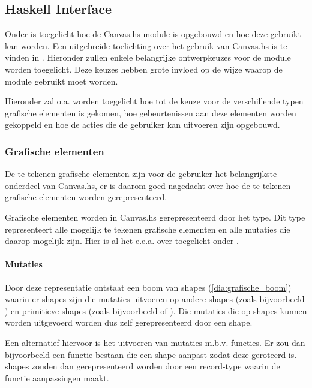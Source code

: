 \subsection{Haskell Interface} \label{subsec:grafische_bibliotheek} 

Onder  is toegelicht hoe de Canvas.hs-module is opgebouwd en hoe deze gebruikt kan worden. Een uitgebreide toelichting over het gebruik van Canvas.hs is te vinden in . Hieronder zullen enkele belangrijke ontwerpkeuzes voor de module worden toegelicht. Deze keuzes hebben grote invloed op de wijze waarop de module gebruikt moet worden. 

Hieronder zal o.a. worden toegelicht hoe tot de keuze voor de verschillende typen grafische elementen is gekomen, hoe gebeurtenissen aan deze elementen worden gekoppeld en hoe de acties die de gebruiker kan uitvoeren zijn opgebouwd.

\subsubsection{Grafische elementen}
De te tekenen grafische elementen zijn voor de gebruiker het belangrijkste onderdeel van Canvas.hs, er is daarom goed nagedacht over hoe de te tekenen grafische elementen worden gerepresenteerd. 

Grafische elementen worden in Canvas.hs gerepresenteerd door het type. Dit type representeert alle mogelijk te tekenen grafische elementen en alle mutaties die daarop mogelijk zijn. Hier is al het e.e.a. over toegelicht onder .

\paragraph{Mutaties}
Door deze representatie ontstaat een boom van shapes (\autoref{dia:grafische_boom}) waarin er shapes zijn die mutaties uitvoeren op andere shapes (zoals bijvoorbeeld ) en primitieve shapes (zoals bijvoorbeeld  of ). Die mutaties die op shapes kunnen worden uitgevoerd worden dus zelf gerepresenteerd door een shape.

Een alternatief hiervoor is het uitvoeren van mutaties m.b.v. functies. Er zou dan bijvoorbeeld een functie  bestaan die een shape aanpast zodat deze geroteerd is. shapes zouden dan gerepresenteerd worden door een record-type waarin de functie aanpassingen maakt. 


